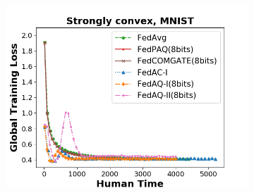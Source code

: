 \begin{figure}[!htbp]
\begin{subfigure}[b]{0.31\textwidth}
    \end{subfigure}
    \begin{subfigure}[b]{0.31\textwidth}
    \includegraphics[width=\textwidth]{figure/loss_iid_time_str_cvx.png}
    \end{subfigure}
    

\end{figure}
